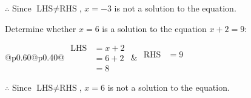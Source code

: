 \documentclass[12pt]{article}
\newcounter{minipagecount}
\begin{document}
\begin{multicols}{2}
\begin{minipage}[t]{0.40\textwidth}
    \noindent \(\therefore\) Since \(\text{LHS} \neq \text{RHS}\), \(x = -3\) is not  a solution to the equation.

\end{minipage}

 \vspace*{16pt}
\noindent{(\theminipagecount)}\hspace{0.1mm} %
\begin{minipage}[t]{0.40\textwidth} %

    \noindent Determine whether \(x = 6\) is a solution to the equation \(x + 2 = 9\):
    \vspace{4pt}  %

    \noindent
    \renewcommand{\arraystretch}{1.3} %
    \begin{tabular}{@{}p{0.60\linewidth}@{}p{0.40\linewidth}@{}}
        \(\begin{aligned}
            \text{LHS} &= x + 2 \\
                    &= 6 + 2 \\
                    &= 8 
        \end{aligned}\) &
        \(\begin{aligned}
            \text{RHS} &= 9\\
                    & \\
                    &
        \end{aligned}\)
    \end{tabular}
    \renewcommand{\arraystretch}{1.0} %
    \vspace{2pt}  %

    \noindent \(\therefore\) Since \(\text{LHS} \neq \text{RHS}\), \(x = 6\) is not  a solution to the equation.

\end{minipage}

 \vspace*{16pt}
\noindent{(\theminipagecount)}\hspace{0.1mm} %
\begin{minipage}[t]{0.40\textwidth} %


\end{minipage}
\end{multicols}
\end{document}
